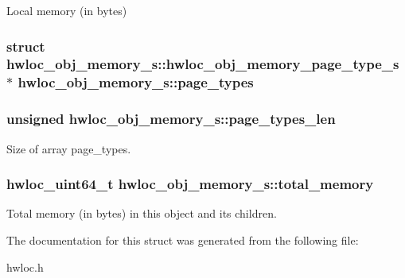Local memory (in bytes) 

\hypertarget{a00020_a865eba7b12b986d72dbe7a2cfd97c50d}{
\subsubsection[{page\_\-types}]{\setlength{\rightskip}{0pt plus 5cm}struct {\bf hwloc\_\-obj\_\-memory\_\-s::hwloc\_\-obj\_\-memory\_\-page\_\-type\_\-s} $\ast$  {\bf hwloc\_\-obj\_\-memory\_\-s::page\_\-types}}}
\label{a00020_a865eba7b12b986d72dbe7a2cfd97c50d}
\hypertarget{a00020_a208c27f4491077d7fb9ba5db8b29cb57}{
\subsubsection[{page\_\-types\_\-len}]{\setlength{\rightskip}{0pt plus 5cm}unsigned {\bf hwloc\_\-obj\_\-memory\_\-s::page\_\-types\_\-len}}}
\label{a00020_a208c27f4491077d7fb9ba5db8b29cb57}


Size of array {\ttfamily page\_\-types}. 

\hypertarget{a00020_a8befd0b3f4f8b695cafed04b31f36a44}{
\subsubsection[{total\_\-memory}]{\setlength{\rightskip}{0pt plus 5cm}hwloc\_\-uint64\_\-t {\bf hwloc\_\-obj\_\-memory\_\-s::total\_\-memory}}}
\label{a00020_a8befd0b3f4f8b695cafed04b31f36a44}


Total memory (in bytes) in this object and its children. 



The documentation for this struct was generated from the following file:\begin{DoxyCompactItemize}
\item 
hwloc.h\end{DoxyCompactItemize}
